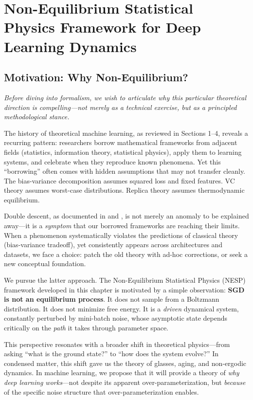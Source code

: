 \documentclass[
  journal=largetwo,
  simfonts=false,
  year=2025,
  volume=37,
]{cup-journal}
\begin{document}
\section{Non-Equilibrium Statistical Physics Framework for Deep Learning Dynamics}

\subsection{Motivation: Why Non-Equilibrium?}

\textit{Before diving into formalism, we wish to articulate why this particular theoretical direction is compelling---not merely as a technical exercise, but as a principled methodological stance.}

The history of theoretical machine learning, as reviewed in Sections 1--4, reveals a recurring pattern: researchers borrow mathematical frameworks from adjacent fields (statistics, information theory, statistical physics), apply them to learning systems, and celebrate when they reproduce known phenomena. Yet this ``borrowing'' often comes with hidden assumptions that may not transfer cleanly. The bias-variance decomposition assumes squared loss and fixed features. VC theory assumes worst-case distributions. Replica theory assumes thermodynamic equilibrium.

Double descent, as documented in \cite{belkin_reconciling_2019} and \cite{nakkiran_deep_2019}, is not merely an anomaly to be explained away---it is a \textit{symptom} that our borrowed frameworks are reaching their limits. When a phenomenon systematically violates the predictions of classical theory (bias-variance tradeoff), yet consistently appears across architectures and datasets, we face a choice: patch the old theory with ad-hoc corrections, or seek a new conceptual foundation.

We pursue the latter approach. The Non-Equilibrium Statistical Physics (NESP) framework developed in this chapter is motivated by a simple observation: \textbf{SGD is not an equilibrium process}. It does not sample from a Boltzmann distribution. It does not minimize free energy. It is a \textit{driven} dynamical system, constantly perturbed by mini-batch noise, whose asymptotic state depends critically on the \textit{path} it takes through parameter space.

This perspective resonates with a broader shift in theoretical physics---from asking ``what is the ground state?'' to ``how does the system evolve?'' In condensed matter, this shift gave us the theory of glasses, aging, and non-ergodic dynamics. In machine learning, we propose that it will provide a theory of \textit{why deep learning works}---not despite its apparent over-parameterization, but \textit{because} of the specific noise structure that over-parameterization enables.
\end{document}
